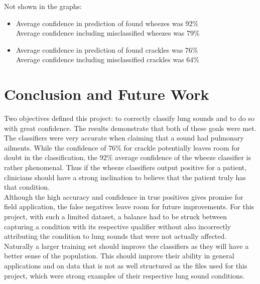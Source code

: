 \documentclass{article}
\begin{document}
Not shown in the graphs:
\begin{itemize}
\item
	Average confidence in prediction of found wheezes was $92\%$\\
	Average confidence including misclassified wheezes was $79\%$
\item
	Average confidence in prediction of found crackles was $76\%$\\
	Average confidence including misclassified crackles was $64\%$
\end{itemize}

\newpage

\section{Conclusion and Future Work}

Two objectives defined this project: to correctly classify lung sounds and to do so with great confidence. The results demonstrate that both of these goals were met. The classifiers were very accurate when claiming that a sound had pulmonary ailments. While the confidence of $76\%$ for crackle potentially leaves room for doubt in the classification, the $92\%$ average confidence of the wheeze classifier is rather phenomenal. Thus if the wheeze classifiers output positive for a patient, clinicians should have a strong inclination to believe that the patient truly has that condition.\\

Although the high accuracy and confidence in true positives gives promise for field application, the false negatives leave room for future improvements. For this project, with such a limited dataset, a balance had to be struck between capturing a condition with its respective qualifier without also incorrectly attributing the condition to lung sounds that were not actually affected. Naturally a larger training set should improve the classifiers as they will have a better sense of the population. This should improve their ability in general applications and on data that is not as well structured as the files used for this project, which were strong examples of their respective lung sound conditions.\\
\end{document}
